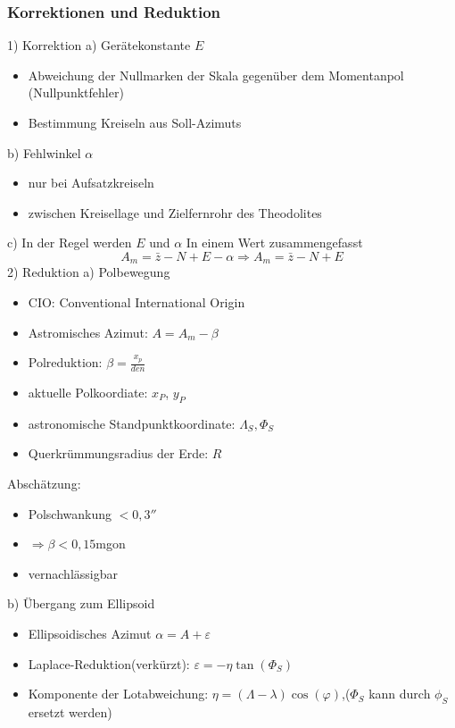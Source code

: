\documentclass[12pt]{article}
\begin{document}
\subsubsection{Korrektionen und Reduktion}
1) Korrektion
a) Gerätekonstante $E$
\begin{itemize}
	\item Abweichung der Nullmarken der Skala gegenüber dem Momentanpol (Nullpunktfehler)
	\item Bestimmung Kreiseln aus Soll-Azimuts
\end{itemize}
b) Fehlwinkel $\alpha$
\begin{itemize}
	\item nur bei Aufsatzkreiseln 
	\item zwischen Kreisellage und Zielfernrohr des Theodolites
\end{itemize}
c) In der Regel werden $E$ und $\alpha$ In einem Wert zusammengefasst
\begin{equation*}
A_m = \bar{z} - N + E - \alpha \Longrightarrow A_m = \bar{z} - N + E
\end{equation*}
2) Reduktion \newline
a) Polbewegung 
\begin{itemize}
	\item CIO: Conventional International Origin
	\item Astromisches Azimut: $A = A_m - \beta$
	\item Polreduktion: $\beta = \frac{x_p}{den}$
	\item aktuelle Polkoordiate: $x_P$, $y_P$
	\item astronomische Standpunktkoordinate: $\Lambda_S, \Phi_S$
	\item Querkrümmungsradius der Erde: $R$
\end{itemize}
Abschätzung: 
\begin{itemize}
	\item Polschwankung $<0,3''$
	\item $\Rightarrow \beta < 0,15$mgon
	\item vernachlässigbar
\end{itemize}
b) Übergang zum Ellipsoid
\begin{itemize}
	\item Ellipsoidisches Azimut $\alpha = A + \varepsilon$
	\item Laplace-Reduktion(verkürzt): $\varepsilon = -\eta \tan(\Phi_S)$
	\item Komponente der Lotabweichung: $\eta = (\Lambda - \lambda)\cos(\varphi)$,($\Phi_S$ kann durch $\phi_S$ ersetzt werden)
\end{itemize}
\end{document}
